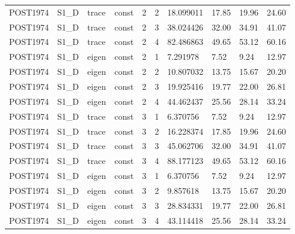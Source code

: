 \begin{tabular}{llllllllll}
POST1974 & S1\_D & trace & const & 2 & 2 & 18.099011 & 17.85 & 19.96 & 24.60 \\
POST1974 & S1\_D & trace & const & 2 & 3 & 38.024426 & 32.00 & 34.91 & 41.07 \\
POST1974 & S1\_D & trace & const & 2 & 4 & 82.486863 & 49.65 & 53.12 & 60.16 \\
POST1974 & S1\_D & eigen & const & 2 & 1 & 7.291978 & 7.52 & 9.24 & 12.97 \\
POST1974 & S1\_D & eigen & const & 2 & 2 & 10.807032 & 13.75 & 15.67 & 20.20 \\
POST1974 & S1\_D & eigen & const & 2 & 3 & 19.925416 & 19.77 & 22.00 & 26.81 \\
POST1974 & S1\_D & eigen & const & 2 & 4 & 44.462437 & 25.56 & 28.14 & 33.24 \\
POST1974 & S1\_D & trace & const & 3 & 1 & 6.370756 & 7.52 & 9.24 & 12.97 \\
POST1974 & S1\_D & trace & const & 3 & 2 & 16.228374 & 17.85 & 19.96 & 24.60 \\
POST1974 & S1\_D & trace & const & 3 & 3 & 45.062706 & 32.00 & 34.91 & 41.07 \\
POST1974 & S1\_D & trace & const & 3 & 4 & 88.177123 & 49.65 & 53.12 & 60.16 \\
POST1974 & S1\_D & eigen & const & 3 & 1 & 6.370756 & 7.52 & 9.24 & 12.97 \\
POST1974 & S1\_D & eigen & const & 3 & 2 & 9.857618 & 13.75 & 15.67 & 20.20 \\
POST1974 & S1\_D & eigen & const & 3 & 3 & 28.834331 & 19.77 & 22.00 & 26.81 \\
POST1974 & S1\_D & eigen & const & 3 & 4 & 43.114418 & 25.56 & 28.14 & 33.24 \\
\hline
\end{tabular}
